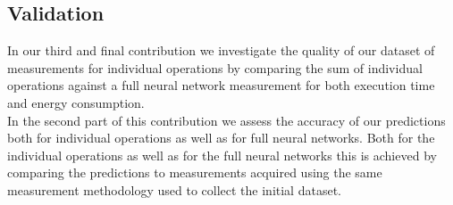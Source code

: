 \subsection{Validation}
In our third and final contribution we investigate the quality of our dataset of
measurements for individual operations by comparing the sum of individual operations
against a full neural network measurement for both execution time and energy consumption.\\
In the second part of this contribution we assess the accuracy of our predictions
both for individual operations as well as for full neural networks. Both for the
individual operations as well as for the full neural networks this is achieved by
comparing the predictions to measurements acquired using the same measurement
methodology used to collect the initial dataset.






% 

% 


